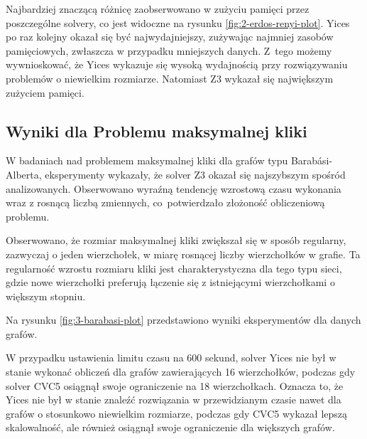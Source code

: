 
Najbardziej znaczącą różnicę zaobserwowano w zużyciu pamięci przez poszczególne solvery, co jest widoczne na rysunku \ref{fig:2-erdos-renyi-plot}. Yices po raz kolejny okazał się być najwydajniejszy, zużywając najmniej zasobów pamięciowych, zwłaszcza w przypadku mniejszych danych. Z~tego możemy wywnioskować, że Yices wykazuje się wysoką wydajnością przy rozwiązywaniu problemów o niewielkim rozmiarze. Natomiast Z3 wykazał się największym zużyciem pamięci.

\subsection{Wyniki dla Problemu maksymalnej kliki}

W badaniach nad problemem maksymalnej kliki dla grafów typu Barabási-Alberta, eksperymenty wykazały, że solver Z3 okazał się najszybszym spośród analizowanych. Obserwowano wyraźną tendencję wzrostową czasu wykonania wraz z rosnącą liczbą zmiennych, co~potwierdzało złożoność obliczeniową problemu.

Obserwowano, że rozmiar maksymalnej kliki zwiększał się w sposób regularny, zazwyczaj o jeden wierzchołek, w miarę rosnącej liczby wierzchołków w grafie. Ta regularność wzrostu rozmiaru kliki jest charakterystyczna dla tego typu sieci, gdzie nowe wierzchołki preferują łączenie się z istniejącymi wierzchołkami o większym stopniu.

Na rysunku \ref{fig:3-barabasi-plot} przedstawiono wyniki eksperymentów dla danych grafów.

W przypadku ustawienia limitu czasu na 600 sekund, solver Yices nie był w stanie wykonać obliczeń dla grafów zawierających 16 wierzchołków, podczas gdy solver CVC5 osiągnął swoje ograniczenie na 18 wierzchołkach. Oznacza to, że Yices nie był w stanie znaleźć rozwiązania w przewidzianym czasie nawet dla grafów o stosunkowo niewielkim rozmiarze, podczas gdy CVC5 wykazał lepszą skalowalność, ale również osiągnął swoje ograniczenie dla większych grafów.

